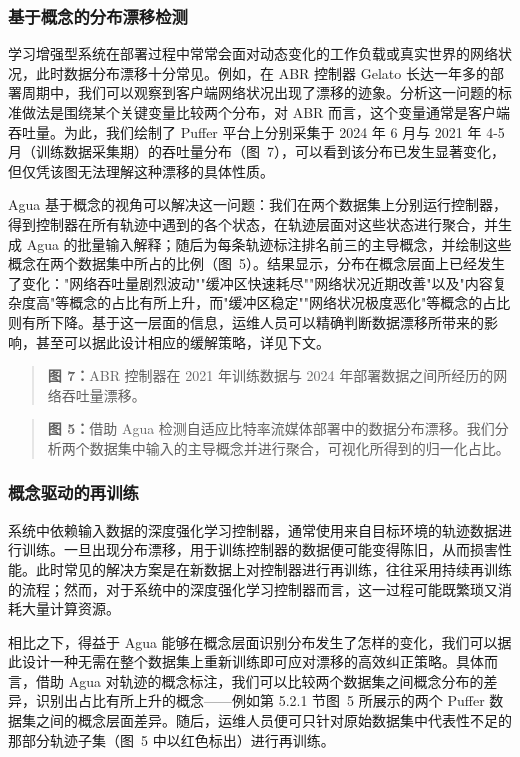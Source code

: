 \documentclass[11pt,a4paper]{article}
\begin{document}
\subsubsection{基于概念的分布漂移检测}

学习增强型系统在部署过程中常常会面对动态变化的工作负载或真实世界的网络状况，此时数据分布漂移十分常见。例如，在 ABR 控制器 Gelato 长达一年多的部署周期中，我们可以观察到客户端网络状况出现了漂移的迹象。分析这一问题的标准做法是围绕某个关键变量比较两个分布，对 ABR 而言，这个变量通常是客户端吞吐量。为此，我们绘制了 Puffer 平台上分别采集于 2024 年 6 月与 2021 年 4-5 月（训练数据采集期）的吞吐量分布（图~7），可以看到该分布已发生显著变化，但仅凭该图无法理解这种漂移的具体性质。

Agua 基于概念的视角可以解决这一问题：我们在两个数据集上分别运行控制器，得到控制器在所有轨迹中遇到的各个状态，在轨迹层面对这些状态进行聚合，并生成 Agua 的批量输入解释；随后为每条轨迹标注排名前三的主导概念，并绘制这些概念在两个数据集中所占的比例（图~5）。结果显示，分布在概念层面上已经发生了变化："网络吞吐量剧烈波动""缓冲区快速耗尽""网络状况近期改善"以及"内容复杂度高"等概念的占比有所上升，而"缓冲区稳定""网络状况极度恶化"等概念的占比则有所下降。基于这一层面的信息，运维人员可以精确判断数据漂移所带来的影响，甚至可以据此设计相应的缓解策略，详见下文。

\begin{quote}\small\noindent\textbf{图 7：}ABR 控制器在 2021 年训练数据与 2024 年部署数据之间所经历的网络吞吐量漂移。\end{quote}

\begin{quote}\small\noindent\textbf{图 5：}借助 Agua 检测自适应比特率流媒体部署中的数据分布漂移。我们分析两个数据集中输入的主导概念并进行聚合，可视化所得到的归一化占比。\end{quote}

\subsubsection{概念驱动的再训练}

系统中依赖输入数据的深度强化学习控制器，通常使用来自目标环境的轨迹数据进行训练。一旦出现分布漂移，用于训练控制器的数据便可能变得陈旧，从而损害性能。此时常见的解决方案是在新数据上对控制器进行再训练，往往采用持续再训练的流程；然而，对于系统中的深度强化学习控制器而言，这一过程可能既繁琐又消耗大量计算资源。

相比之下，得益于 Agua 能够在概念层面识别分布发生了怎样的变化，我们可以据此设计一种无需在整个数据集上重新训练即可应对漂移的高效纠正策略。具体而言，借助 Agua 对轨迹的概念标注，我们可以比较两个数据集之间概念分布的差异，识别出占比有所上升的概念——例如第 5.2.1 节图~5 所展示的两个 Puffer 数据集之间的概念层面差异。随后，运维人员便可只针对原始数据集中代表性不足的那部分轨迹子集（图~5 中以红色标出）进行再训练。
\end{document}
